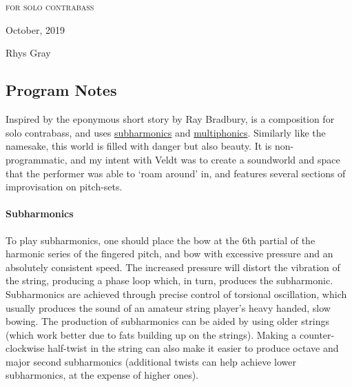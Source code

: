 
\chapter[\bassPiece]{}

\vspace*{3cm}
\begin{center}
\textsc{for solo contrabass}

\vspace*{3.5cm}

\HRule{0.5pt}


\LARGE \textbf{\uppercase{\bassPiece}}
\HRule{2pt}

\vspace{1.3cm}

\normalsize October, 2019
\date{}

\vspace*{5\baselineskip}

Rhys Gray

\end{center}
\newpage
\newpage

\section*{Program Notes}
Inspired by the eponymous short story by Ray Bradbury, \bassPiece\space is a composition for solo contrabass, and uses \hyperref[sec:subharmonics]{subharmonics} and \hyperref[sec:multiphonics]{multiphonics}. 
Similarly like the namesake, this world is filled with danger but also beauty. 
It is non-programmatic, and my intent with Veldt was to create a soundworld and space that the performer was able to `roam around' in, and features several sections of improvisation on pitch-sets.

\subsubsection*{Subharmonics}
To play subharmonics, one should place the bow at the 6th partial of the harmonic series of the fingered pitch, and bow with excessive pressure and an absolutely consistent speed. 
The increased pressure will distort the vibration of the string, producing a phase loop which, in turn, produces the subharmonic. 
Subharmonics are achieved through precise control of torsional oscillation, which usually produces the sound of an amateur string player's heavy handed, slow bowing. 
The production of subharmonics can be aided by using older strings (which work better due to fats building up on the strings). 
Making a counter-clockwise half-twist in the string can also make it easier to produce octave and major second subharmonics (additional twists can help achieve lower subharmonics, at the expense of higher ones).

